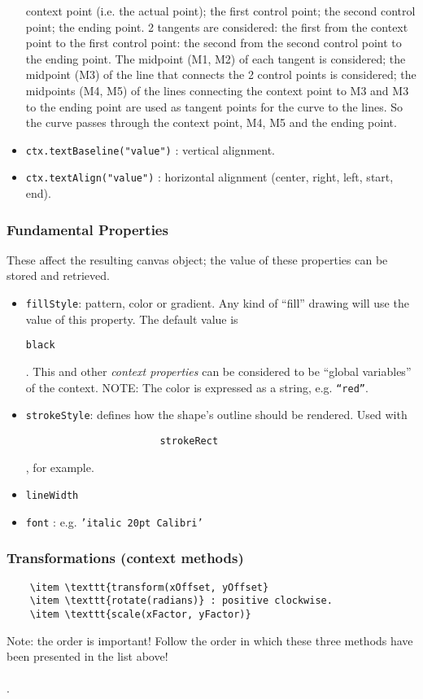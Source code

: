 \documentclass[a4paper,11pt]{book}
\begin{document}
\begin{itemize}
			context point (i.e. the actual point); the first control point; the second control point; the ending point.
			2 tangents are considered: the first from the context point to the first control point: the second from the
			second control point to the ending point. The midpoint (M1, M2) of each tangent is considered; the midpoint
			(M3) of the line that connects the 2 control points is considered; the midpoints (M4, M5) of the lines
			connecting the context point to M3 and M3 to the ending point are used as tangent points for the curve to
			the lines. So the curve passes through the context point, M4, M5 and the ending point.			
	\item \texttt{ctx.textBaseline("value")} : vertical alignment.
	\item \texttt{ctx.textAlign("value")} : horizontal alignment (center, right, left, start, end).
	\end{itemize}
	
	\subsubsection{Fundamental Properties}
	These affect the resulting canvas object; the value of these properties can be stored and
	retrieved.
	\begin{itemize}
	\item \texttt{fillStyle}: pattern, color or gradient. Any kind of ``fill'' drawing will use the value
					 of this property. The default value is \begin{verbatim}black\end{verbatim}.
					 This and other \emph{context properties} can be considered to be
					 ``global variables'' of the context. NOTE: The color is expressed as a string, e.g.
					 \texttt{``red''}.
	\item \texttt{strokeStyle}: defines how the shape's outline should be rendered. Used with \begin{verbatim}
					   strokeRect\end{verbatim}, for example.
	\item \texttt{lineWidth}
	\item \texttt{font} : e.g. \texttt{'italic 20pt Calibri'}
	\end{itemize}
	
	\subsubsection{Transformations (context methods)}
	\begin{verbatim}
	\item \texttt{transform(xOffset, yOffset}
	\item \texttt{rotate(radians)} : positive clockwise.
	\item \texttt{scale(xFactor, yFactor)}
	\end{verbatim}
	Note: the order is important! Follow the order in which these three methods have been presented in the list above!
	\\ \\  .
\end{document}
